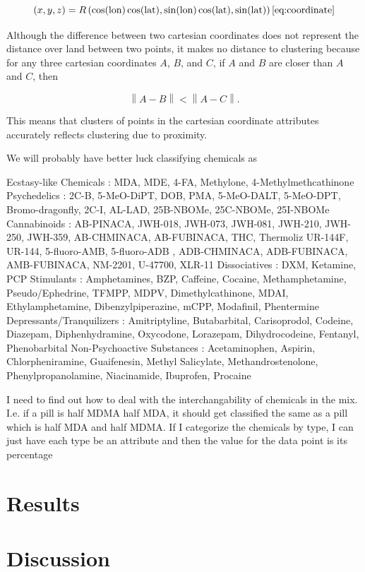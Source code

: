 \documentclass[%
 reprint,
nofootinbib,
 amsmath,amssymb,
 aps,
]{revtex4-1}
\newcommand{\abs}[1]{\left\|{#1}\right\|}
\begin{document}
	\begin{equation}
		(x, y, z) = R \left(\cos(\text{lon})\cos(\text{lat}), \sin(\text{lon})\cos(\text{lat}), \sin(\text{lat})\right) \eqref{eq:coordinate}
	\end{equation}

	Although the difference between two cartesian coordinates does not represent the distance over land between two points, it makes no distance to clustering because for any three cartesian coordinates $A$, $B$, and $C$, if $A$ and $B$ are closer than $A$ and $C$, then

	\begin{equation}
		\abs{A-B} < \abs{A-C}.
	\end{equation}

	This means that clusters of points in the cartesian coordinate attributes accurately reflects clustering due to proximity.

We will probably have better luck classifying chemicals as

Ecstasy-like Chemicals : MDA, MDE, 4-FA, Methylone, 4-Methylmethcathinone
Psychedelics : 2C-B, 5-MeO-DiPT, DOB, PMA, 5-MeO-DALT, 5-MeO-DPT, Bromo-dragonfly, 2C-I, AL-LAD, 25B-NBOMe, 25C-NBOMe, 25I-NBOMe
Cannabinoids : AB-PINACA, JWH-018, JWH-073, JWH-081, JWH-210, JWH-250, JWH-359, AB-CHMINACA, AB-FUBINACA, THC, Thermoliz UR-144F, UR-144, 5-fluoro-AMB, 5-fluoro-ADB , ADB-CHMINACA, ADB-FUBINACA, AMB-FUBINACA, NM-2201, U-47700, XLR-11
Dissociatives : DXM, Ketamine, PCP
Stimulants : Amphetamines, BZP, Caffeine, Cocaine, Methamphetamine, Pseudo/Ephedrine, TFMPP, MDPV, Dimethylcathinone, MDAI, Ethylamphetamine, Dibenzylpiperazine, mCPP, Modafinil, Phentermine
Depressants/Tranquilizers : Amitriptyline, Butabarbital, Carisoprodol, Codeine, Diazepam, Diphenhydramine, Oxycodone, Lorazepam, Dihydrocodeine, Fentanyl, Phenobarbital
Non-Psychoactive Substances : Acetaminophen, Aspirin, Chlorpheniramine, Guaifenesin, Methyl Salicylate, Methandrostenolone, Phenylpropanolamine, Niacinamide, Ibuprofen, Procaine

I need to find out how to deal with the interchangability of chemicals in the mix. I.e. if a pill is half MDMA half MDA, it should get classified the same as a pill which is half MDA and half MDMA. If I categorize the chemicals by type, I can just have each type be an attribute and then the value for the data point is its percentage

\section{\label{sec:Results}Results}


\section{\label{sec:Discussion}Discussion}


%
%
\end{document}
